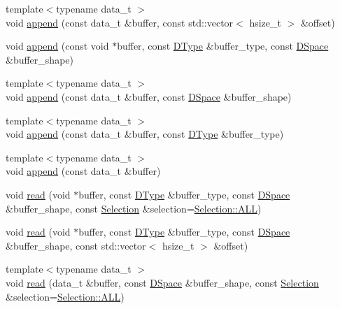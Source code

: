 \begin{DoxyCompactItemize}
\item 
{\footnotesize template$<$typename data\-\_\-t $>$ }\\void \hyperlink{class_h5_t_l_1_1_dataset_a21a8ba439908fc08837b01e737247f37}{append} (const data\-\_\-t \&buffer, const std\-::vector$<$ hsize\-\_\-t $>$ \&offset)
\item 
void \hyperlink{class_h5_t_l_1_1_dataset_aba2bb711bf30e38ac5078663c200c318}{append} (const void $\ast$buffer, const \hyperlink{class_h5_t_l_1_1_d_type}{D\-Type} \&buffer\-\_\-type, const \hyperlink{class_h5_t_l_1_1_d_space}{D\-Space} \&buffer\-\_\-shape)
\item 
{\footnotesize template$<$typename data\-\_\-t $>$ }\\void \hyperlink{class_h5_t_l_1_1_dataset_a791cc0c96a11264f01137984487ee17c}{append} (const data\-\_\-t \&buffer, const \hyperlink{class_h5_t_l_1_1_d_space}{D\-Space} \&buffer\-\_\-shape)
\item 
{\footnotesize template$<$typename data\-\_\-t $>$ }\\void \hyperlink{class_h5_t_l_1_1_dataset_a82d72341e7102390af4995aaaea3962a}{append} (const data\-\_\-t \&buffer, const \hyperlink{class_h5_t_l_1_1_d_type}{D\-Type} \&buffer\-\_\-type)
\item 
{\footnotesize template$<$typename data\-\_\-t $>$ }\\void \hyperlink{class_h5_t_l_1_1_dataset_a72b917d03cf1be028b0a60663f3735da}{append} (const data\-\_\-t \&buffer)
\item 
void \hyperlink{class_h5_t_l_1_1_dataset_a13145066f529134568242b3aa03ff991}{read} (void $\ast$buffer, const \hyperlink{class_h5_t_l_1_1_d_type}{D\-Type} \&buffer\-\_\-type, const \hyperlink{class_h5_t_l_1_1_d_space}{D\-Space} \&buffer\-\_\-shape, const \hyperlink{class_h5_t_l_1_1_selection}{Selection} \&selection=\hyperlink{class_h5_t_l_1_1_selection_a32d830ebff3c607e0425fa5d6ef72df0}{Selection\-::\-A\-L\-L})
\item 
void \hyperlink{class_h5_t_l_1_1_dataset_abddc9236c56c2631b70dc2347d5788bd}{read} (void $\ast$buffer, const \hyperlink{class_h5_t_l_1_1_d_type}{D\-Type} \&buffer\-\_\-type, const \hyperlink{class_h5_t_l_1_1_d_space}{D\-Space} \&buffer\-\_\-shape, const std\-::vector$<$ hsize\-\_\-t $>$ \&offset)
\item 
{\footnotesize template$<$typename data\-\_\-t $>$ }\\void \hyperlink{class_h5_t_l_1_1_dataset_ab0f7e4ae35955b9c4990f23405b37186}{read} (data\-\_\-t \&buffer, const \hyperlink{class_h5_t_l_1_1_d_space}{D\-Space} \&buffer\-\_\-shape, const \hyperlink{class_h5_t_l_1_1_selection}{Selection} \&selection=\hyperlink{class_h5_t_l_1_1_selection_a32d830ebff3c607e0425fa5d6ef72df0}{Selection\-::\-A\-L\-L})

\end{DoxyCompactItemize}
